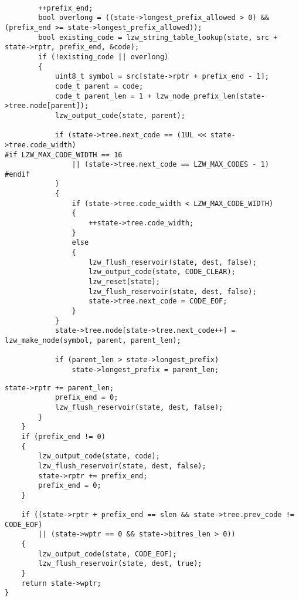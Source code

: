 \begin{center}
    \captionsetup{justification=raggedright,singlelinecheck=off}
    \begin{lstlisting}[label=lst:lzw-2,caption=Реализация алгоритма сжатия LZW (часть 2)]
	
		++prefix_end;
		bool overlong = ((state->longest_prefix_allowed > 0) && (prefix_end >= state->longest_prefix_allowed));
		bool existing_code = lzw_string_table_lookup(state, src + state->rptr, prefix_end, &code);
		if (!existing_code || overlong)
        {
			uint8_t symbol = src[state->rptr + prefix_end - 1];
			code_t parent = code;
			code_t parent_len = 1 + lzw_node_prefix_len(state->tree.node[parent]);
			lzw_output_code(state, parent);

			if (state->tree.next_code == (1UL << state->tree.code_width)
#if LZW_MAX_CODE_WIDTH == 16
				|| (state->tree.next_code == LZW_MAX_CODES - 1)
#endif
            )
            {
				if (state->tree.code_width < LZW_MAX_CODE_WIDTH)
                {
					++state->tree.code_width;
				}
                else
                {
					lzw_flush_reservoir(state, dest, false);
					lzw_output_code(state, CODE_CLEAR);
					lzw_reset(state);
					lzw_flush_reservoir(state, dest, false);
					state->tree.next_code = CODE_EOF;
				}
			}
			state->tree.node[state->tree.next_code++] = lzw_make_node(symbol, parent, parent_len);

			if (parent_len > state->longest_prefix)
				state->longest_prefix = parent_len;
\end{lstlisting}
\end{center}


\begin{center}
    \captionsetup{justification=raggedright,singlelinecheck=off}
    \begin{lstlisting}[label=lst:lzw-3,caption=Реализация алгоритма сжатия LZW (часть 3)]
			state->rptr += parent_len;
			prefix_end = 0;
			lzw_flush_reservoir(state, dest, false);
		}
	}
	if (prefix_end != 0)
    {
		lzw_output_code(state, code);
		lzw_flush_reservoir(state, dest, false);
		state->rptr += prefix_end;
		prefix_end = 0;
	}

	if ((state->rptr + prefix_end == slen && state->tree.prev_code != CODE_EOF)
		|| (state->wptr == 0 && state->bitres_len > 0))
    {
		lzw_output_code(state, CODE_EOF);
		lzw_flush_reservoir(state, dest, true);
	}
	return state->wptr;
}
\end{lstlisting}
\end{center}

